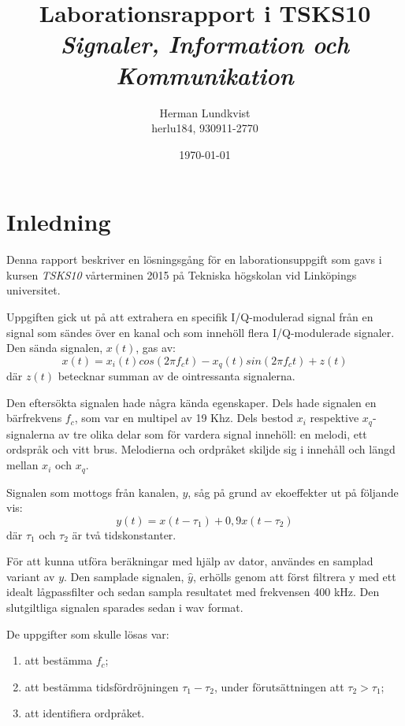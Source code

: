 \documentclass[10pt,twocolumn]{article}
\title{Laborationsrapport i TSKS10 \emph{Signaler, Information och Kommunikation}}
\author{Herman Lundkvist \\ herlu184, 930911-2770 }
\date{\today}
\begin{document}
\maketitle

\section{Inledning}

Denna rapport beskriver en lösningsgång för en laborationsuppgift som gavs i
kursen \emph{TSKS10} vårterminen 2015 på Tekniska högskolan vid Linköpings
universitet.

Uppgiften gick ut på att extrahera en specifik I/Q-modulerad signal från en signal som sändes
över en kanal och som innehöll flera I/Q-modulerade signaler. Den sända signalen, $x(t)$, gas av:
\begin{equation}
x(t) = x_i(t) cos(2 \pi f_ct) - x_q(t) sin(2 \pi f_c t) + z(t)
\label{e1}
\end{equation}
där $z(t)$ betecknar summan av de ointressanta signalerna.

Den eftersökta signalen hade några kända egenskaper. Dels hade signalen en
bärfrekvens $f_c$, som var en multipel av 19 Khz. Dels bestod $x_i$ respektive
$x_q$-signalerna av tre olika delar som för vardera signal innehöll: en melodi, ett ordspråk
och vitt brus. Melodierna och ordpråket skiljde sig i
innehåll och längd mellan $x_i$ och $x_q$.

Signalen som mottogs från kanalen, $y$, såg på grund av ekoeffekter ut på
följande vis:
\begin{equation}
    y(t)=x(t - \tau_1) + 0,9 x(t - \tau_2)
\end{equation}
där $\tau_1$ och $\tau_2$ är två tidskonstanter.

För att kunna utföra beräkningar med hjälp av dator, användes en samplad
variant av $y$. Den samplade signalen, $\hat{y}$, erhölls genom att först
filtrera y med ett idealt lågpassfilter och sedan sampla resultatet med
frekvensen 400 kHz. Den slutgiltliga signalen sparades sedan i wav format.

De uppgifter som skulle lösas var:
\begin{enumerate}
\item att bestämma $f_c$;
\item att bestämma tidsfördröjningen $\tau_1-\tau_2$, under förutsättningen att
$\tau_2 > \tau_1$;
\item att identifiera ordpråket.
\end{enumerate}
\end{document}
